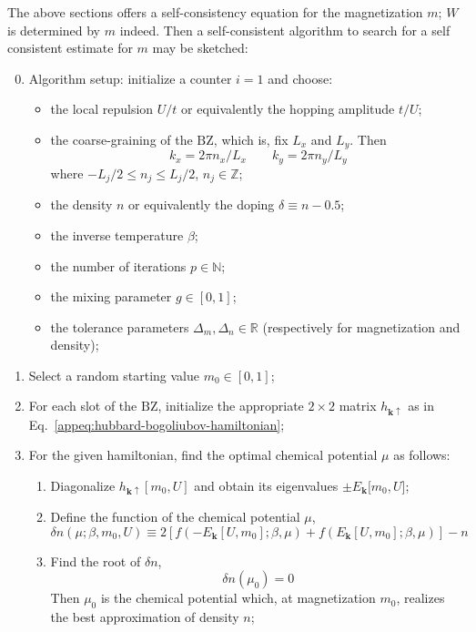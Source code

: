 The above sections offers a self-consistency equation for the magnetization $m$; $W$ is determined by $m$ indeed. Then a self-consistent algorithm to search for a self consistent estimate for $m$ may be sketched:
\begin{enumerate}
	\setcounter{enumi}{-1}
	\item Algorithm setup: initialize a counter $i=1$ and choose:
	\begin{itemize}
		\item the local repulsion $U/t$ or equivalently the hopping amplitude $t/U$;
		\item the coarse-graining of the $\mathrm{BZ}$, which is, fix $L_x$ and $L_y$. Then 
		\[ 
			k_x = 2\pi n_x/L_x
			\qquad
			k_y = 2\pi n_y/L_y 
		\]
		where $-L_j/2 \le n_j \le L_j/2$, $n_j \in \mathbb{Z}$;
		\item the density $n$ or equivalently the doping $\delta \equiv n-0.5$;
		\item the inverse temperature $\beta$;
		\item the number of iterations $p \in \mathbb{N}$; 
		\item the mixing parameter $g \in [0,1]$;
		\item the tolerance parameters $\Delta_m, \Delta_n \in \mathbb{R}$ (respectively for magnetization and density);
	\end{itemize}
	\item Select a random starting value $m_0 \in [0,1]$;
	\item For each slot of the $\mathrm{BZ}$, initialize the appropriate $2\times2$ matrix $h_{\mathbf{k}\uparrow}$ as in Eq.~\eqref{appeq:hubbard-bogoliubov-hamiltonian};
	\item For the given hamiltonian, find the optimal chemical potential $\mu$ as follows:
	\begin{enumerate}
		\item Diagonalize $h_{\mathbf{k}\uparrow}[m_0, U]$ and obtain its eigenvalues $\pm E_\mathbf{k}[m_0, U$]; 
		\item Define the function of the chemical potential $\mu$,
		\[
			\delta n(\mu; \beta, m_0, U) \equiv 2 \left[
			f\left(-E_\mathbf{k}[U,m_0]; \beta,\mu \right) + f \left( E_\mathbf{k}[U,m_0]; \beta,\mu \right)
			\right] - n
		\]
		\item Find the root of $\delta n$, 
		\[
			\delta n(\mu_0) = 0
		\]
		Then $\mu_0$ is the chemical potential which, at magnetization $m_0$, realizes the best approximation of density $n$;
	\end{enumerate}

\end{enumerate}
